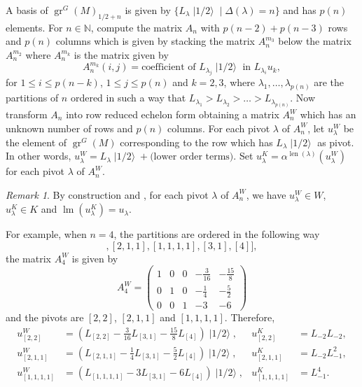 \documentclass[a4paper, 12pt, reqno]{amsart}
\theoremstyle{remark}
\newtheorem{remark}[theorem]{Remark}
\numberwithin{equation}{subsection}
\DeclareMathOperator{\gr}{gr}
\DeclareMathOperator{\lm}{lm}
\DeclareMathOperator{\len}{len}
\DeclareMathOperator{\vachalf}{|1/2\rangle}
\begin{document}
A basis of $\gr^G(M)_{1/2 + n}$ is given by $\{L_{\lambda}\vachalf \mid \Delta(\lambda) = n\}$ and has $p(n)$ elements.
For $n \in \mathbb{N}$, compute the matrix $A_n$ with $p(n - 2) + p(n - 3)$ rows and $p(n)$ columns which is given by stacking the matrix $A^{m_3}_n$ below the matrix $A^{m_2}_n$ where $A^{m_k}_n$ is the matrix given by
\begin{equation*}
  A^{m_k}_n(i, j) = \text{coefficient of }L_{\lambda_j}\vachalf\text{ in }L_{\lambda_i}u_k,
\end{equation*}
for $1 \le i \le p(n - k)$, $1 \le j \le p(n)$ and $k = 2, 3$, where $\lambda_1, \dots, \lambda_{p(n)}$ are the partitions of $n$ ordered in such a way that $L_{\lambda_1} > L_{\lambda_2} > \dots > L_{\lambda_{p(n)}}$.
Now transform $A_n$ into row reduced echelon form obtaining a matrix $A^W_n$ which has an unknown number of rows and $p(n)$ columns.
For each pivot $\lambda$ of $A^W_n$, let $u^W_{\lambda}$ be the element of $\gr^G(M)$ corresponding to the row which has $L_{\lambda}\vachalf$ as pivot.
In other words, $u^W_{\lambda} = L_{\lambda}\vachalf + \text{(lower order terms)}$.
Set $u^K_{\lambda} = \alpha^{\len(\lambda)}(u^W_{\lambda})$ for each pivot $\lambda$ of $A^W_n$.

\begin{remark}
  \label{rmk:40}
  By construction and , for each pivot $\lambda$ of $A^W_n$, we have $u^W_{\lambda} \in W$, $u^K_{\lambda} \in K$ and $\lm(u^K_{\lambda}) = u_{\lambda}$.
\end{remark}

For example, when $n = 4$, the partitions are ordered in the following way
\begin{equation*}
  [[2, 2], [2, 1, 1], [1, 1, 1, 1], [3, 1], [4]],
\end{equation*}
the matrix $A^W_4$ is given by
\begin{equation*}
  A^W_4=
  \begin{pmatrix}
    1 & 0 & 0 & -\frac{3}{16} & -\frac{15}{8} \\
    0 & 1 & 0 & -\frac{1}{4} & -\frac{5}{2} \\
    0 & 0 & 1 & -3 & -6
  \end{pmatrix}
\end{equation*}
and the pivots are $[2, 2]$, $[2, 1, 1]$ and $[1, 1, 1, 1]$.
Therefore,
\begin{align*}
  u^W_{[2, 2]} &= (L_{[2, 2]} - \tfrac{3}{16}L_{[3, 1]} - \tfrac{15}{8}L_{[4]})\vachalf, &u^K_{[2, 2]} &= L_{-2}L_{-2}, \\
  u^W_{[2, 1, 1]} &= (L_{[2, 1, 1]} - \tfrac{1}{4}L_{[3, 1]} - \tfrac{5}{2}L_{[4]})\vachalf, &u^K_{[2, 1, 1]} &= L_{-2}L_{-1}^2, \\
  u^W_{[1, 1, 1, 1]} &= (L_{[1, 1, 1, 1]} - 3L_{[3, 1]} - 6L_{[4]})\vachalf, &u^K_{[1, 1, 1, 1]} &= L_{-1}^4.
\end{align*}
\end{document}
